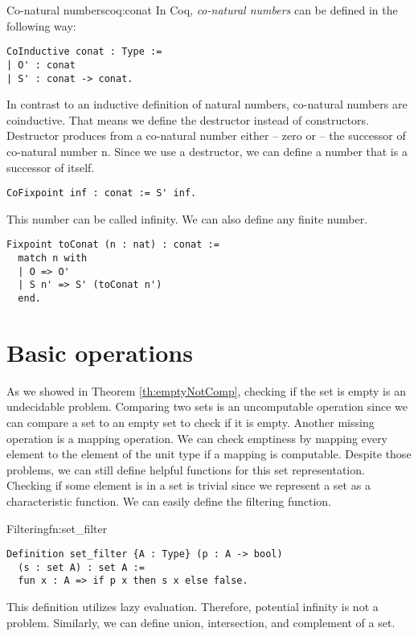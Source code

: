 \begin{coq}{Co-natural numbers}{coq:conat}
In Coq, \emph{co-natural numbers} can be defined in the following way:
\begin{verbatim}
CoInductive conat : Type := 
| O' : conat
| S' : conat -> conat.
\end{verbatim}
In contrast to an inductive definition of natural numbers, co-natural numbers are coinductive. That means we define the destructor instead of constructors. Destructor produces from a co-natural number either  -- zero or  -- the successor of co-natural number n. Since we use a destructor, we can define a number that is a successor of itself.
\begin{verbatim}
CoFixpoint inf : conat := S' inf.
\end{verbatim}
This number can be called infinity. We can also define any finite number.
\begin{verbatim}
Fixpoint toConat (n : nat) : conat :=
  match n with
  | O => O'
  | S n' => S' (toConat n') 
  end.
\end{verbatim}
\end{coq}
\section{Basic operations}
As we showed in Theorem \ref{th:emptyNotComp}, checking if the set is empty is an undecidable problem. Comparing two sets is an uncomputable operation since we can compare a set to an empty set to check if it is empty. Another missing operation is a mapping operation. We can check emptiness by mapping every element to the element of the unit type if a mapping is computable. Despite those problems, we can still define helpful functions for this set representation. Checking if some element is in a set is trivial since we represent a set as a characteristic function. We can easily define the filtering function.
\begin{func}{Filtering}{fn:set_filter}
\begin{verbatim}
Definition set_filter {A : Type} (p : A -> bool) 
  (s : set A) : set A :=
  fun x : A => if p x then s x else false.
\end{verbatim}
\end{func}
This definition utilizes lazy evaluation. Therefore, potential infinity is not a problem. Similarly, we can define union, intersection, and complement of a set.

